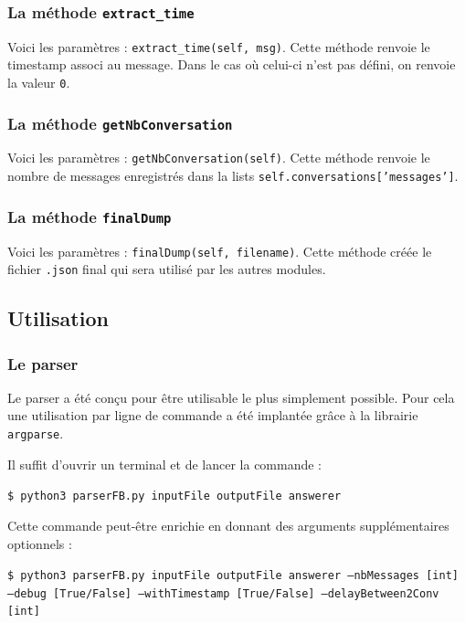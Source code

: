\documentclass[10pt,a4paper]{article}
\begin{document}
\subsubsection{La méthode \texttt{extract\_time}}
Voici les paramètres : \texttt{extract\_time(self, msg)}. Cette méthode renvoie le timestamp associ au message. Dans le cas où celui-ci n'est pas défini, on renvoie la valeur \texttt{0}.

\subsubsection{La méthode \texttt{getNbConversation}}
Voici les paramètres : \texttt{getNbConversation(self)}. Cette méthode renvoie le nombre de messages enregistrés dans la lists \texttt{self.conversations['messages']}.

\subsubsection{La méthode \texttt{finalDump}}
Voici les paramètres : \texttt{finalDump(self, filename)}. Cette méthode créée le fichier \texttt{.json} final qui sera utilisé par les autres modules.

\subsection{Utilisation}
\subsubsection{Le parser}
Le parser a été conçu pour être utilisable le plus simplement possible. Pour cela une utilisation par ligne de commande a été implantée grâce à la librairie \texttt{argparse}.

Il suffit d'ouvrir un terminal et de lancer la commande :

\begin{center}
    \texttt{\$ python3 parserFB.py inputFile outputFile answerer}
\end{center}

Cette commande peut-être enrichie en donnant des arguments supplémentaires optionnels :

\begin{center}
    \texttt{\$ python3 parserFB.py inputFile outputFile answerer --nbMessages [int] --debug [True/False] --withTimestamp [True/False] --delayBetween2Conv [int]}
\end{center}
\end{document}
